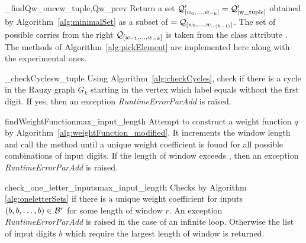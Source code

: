\begin{method}{\_findQw\_once}{w\_tuple,Qw\_prev} 
Return a set $\mathcal{Q}_{[w_{0}, \dots, w_{-k}]}'=\mathcal{Q}'_{[\text{w\_tuple}]}$ obtained by Algorithm~\ref{alg:minimalSet} as a subset of $=\mathcal{Q}_{[w_{0}, \dots, w_{-(k-1)}]}$. The set of possible carries from the right $\mathcal{Q}_{[w_{-1}, \dots, w_{-k}]}$ is taken from the class attribute . The methods of Algorithm~\ref{alg:pickElement} are implemented here along with the experimental ones.
\end{method}

\begin{method}{\_checkCycles}{w\_tuple}
Using Algorithm~\ref{alg:checkCycles}, check if there is a cycle in the Rauzy graph $G_k$ starting in the vertex which label equals  without the first digit. If yes, then an exception \emph{RuntimeErrorParAdd} is raised. 
\end{method}


\begin{method}{findWeightFunction}{max\_input\_length}
Attempt to construct a weight function $q$ by Algorithm~\ref{alg:weightFunction_modified}. It increments the window length and call the method  until a unique weight coefficient is found for all possible combinations of input digits. If the length of window exceeds , then an exception \emph{RuntimeErrorParAdd} is raised. 
\end{method}


\begin{method}{check\_one\_letter\_inputs}{max\_input\_length}
Checks by Algorithm \ref{alg:oneletterSets} if there is a unique weight coefficient for inputs $({b,b,\dots,b})\in\mathcal{B}^r$ for some length of window $r$. An exception \emph{RuntimeErrorParAdd} is raised in the case of an infinite loop. Otherwise the list of input digits  $b$ which require the largest length of window is returned.
\end{method}




